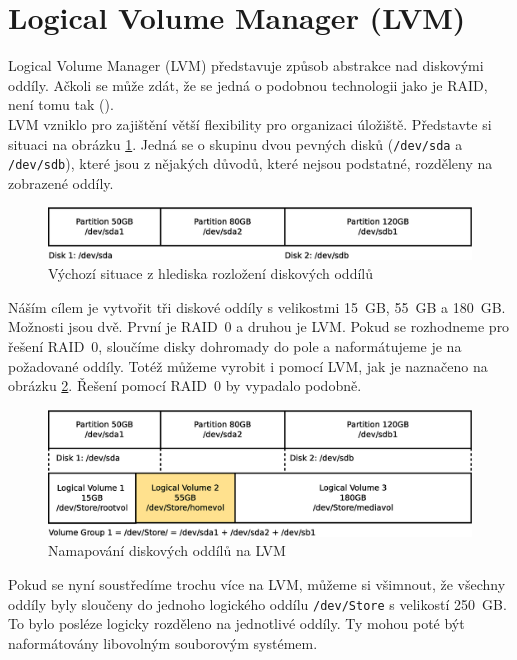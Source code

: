 \section{Logical Volume Manager (LVM)}
Logical Volume Manager (LVM) představuje způsob abstrakce nad diskovými oddíly. Ačkoli se může zdát, že se jedná o podobnou technologii jako je RAID, není tomu tak (\cite{arch-lvm}).\\
LVM vzniklo pro zajištění větší flexibility pro organizaci úložiště. Představte si situaci na obrázku \ref{fig:lvm1}. Jedná se o skupinu dvou pevných disků (\texttt{/dev/sda} a \texttt{/dev/sdb}), které jsou z nějakých důvodů, které nejsou podstatné, rozděleny na zobrazené oddíly.
\begin{figure}[] 
    \centering
    \includegraphics[scale=0.42]{obrazky/lvm1.eps}
    \caption{Výchozí situace z hlediska rozložení diskových oddílů}
    \label{fig:lvm1}
\end{figure}
Náším cílem je vytvořit tři diskové oddíly s velikostmi 15~GB, 55~GB a 180~GB. Možnosti jsou dvě. První je RAID~0 a druhou je LVM. Pokud se rozhodneme pro řešení RAID~0, sloučíme disky dohromady do pole a naformátujeme je na požadované oddíly. Totéž můžeme vyrobit i pomocí LVM, jak je naznačeno na obrázku \ref{fig:lvm2}. Řešení pomocí RAID~0 by vypadalo podobně.
\begin{figure}[] 
    \centering
    \includegraphics[scale=0.42]{obrazky/lvm2.eps}
    \caption{Namapování diskových oddílů na LVM}
    \label{fig:lvm2}
\end{figure}
Pokud se nyní soustředíme trochu více na LVM, můžeme si všimnout, že všechny oddíly byly sloučeny do jednoho logického oddílu \texttt{/dev/Store} s velikostí 250~GB. To bylo posléze logicky rozděleno na jednotlivé oddíly. Ty mohou poté být naformátovány libovolným souborovým systémem.\\
